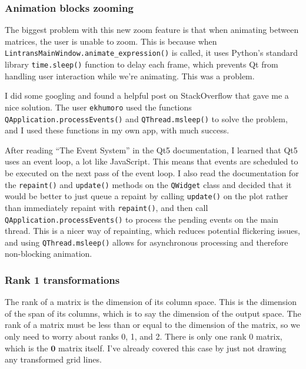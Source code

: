 \documentclass[../development.tex]{subfiles}
\begin{document}
\subsubsection{Animation blocks zooming\label{development:improving-the-gui:animation-blocks-zooming}}

The biggest problem with this new zoom feature is that when animating between matrices, the user is unable to zoom. This is because when \texttt{LintransMainWindow.animate\_expression()} is called, it uses Python's standard library \texttt{time.sleep()} function to delay each frame, which prevents Qt from handling user interaction while we're animating. This was a problem.

I did some googling and found a helpful post on StackOverflow\cite{so-update-window-in-pyqt5} that gave me a nice solution. The user \texttt{ekhumoro} used the functions \texttt{QApplication.processEvents()} and \texttt{QThread.msleep()} to solve the problem, and I used these functions in my own app, with much success.

After reading \enquote{The Event System} in the Qt5 documentation\cite{qt5-docs-event-system}, I learned that Qt5 uses an event loop, a lot like JavaScript. This means that events are scheduled to be executed on the next pass of the event loop. I also read the documentation for the \texttt{repaint()} and \texttt{update()} methods on the \texttt{QWidget} class\cite{qt5-docs-qwidget-repaint,qt5-docs-qwidget-update} and decided that it would be better to just queue a repaint by calling \texttt{update()} on the plot rather than immediately repaint with \texttt{repaint()}, and then call \texttt{QApplication.processEvents()} to process the pending events on the main thread. This is a nicer way of repainting, which reduces potential flickering issues, and using \texttt{QThread.msleep()} allows for asynchronous processing and therefore non-blocking animation.

\subsubsection{Rank 1 transformations\label{development:improving-the-gui:rank-1-transformations}}

The rank of a matrix is the dimension of its column space. This is the dimension of the span of its columns, which is to say the dimension of the output space. The rank of a matrix must be less than or equal to the dimension of the matrix, so we only need to worry about ranks 0, 1, and 2. There is only one rank 0 matrix, which is the $\mathbf{0}$ matrix itself. I've already covered this case by just not drawing any transformed grid lines.
\end{document}
